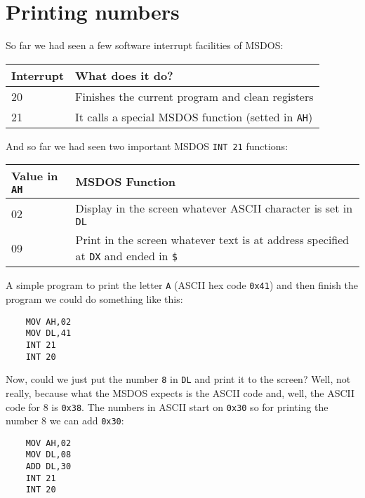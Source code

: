 \documentclass[main.tex]{subfiles}
\begin{document}
\chapter{Printing numbers}
So far we had seen a few software interrupt facilities of MSDOS:

\begin{tabular}{ll}
\toprule
Interrupt & What does it do? \\
\midrule
20 & Finishes the current program and clean registers \\
21 & It calls a special MSDOS function (setted in \texttt{AH}) \\
\bottomrule
\end{tabular}

And so far we had seen two important MSDOS \texttt{INT 21} functions:

\begin{tabular}{ll}
\toprule
Value in \texttt{AH} & MSDOS Function \\
\midrule
02 & Display in the screen whatever ASCII character is set in \texttt{DL} \\
09 & Print in the screen whatever text is at address specified at \texttt{DX} and ended in \texttt{\$} \\
\bottomrule
\end{tabular}

A simple program to print the letter \texttt{A} (ASCII hex code \texttt{0x41}) and then finish the program we could do something like this:

\begin{verbatim}
    MOV AH,02
    MOV DL,41
    INT 21
    INT 20
\end{verbatim}

Now, could we just put the number \texttt{8} in \texttt{DL} and print it to the screen? Well, not really, because what the MSDOS expects is the ASCII code and, well, the ASCII code for 8 is \texttt{0x38}. The numbers in ASCII start on \texttt{0x30} so for printing the number 8 we can add \texttt{0x30}:

\begin{verbatim}
    MOV AH,02
    MOV DL,08
    ADD DL,30
    INT 21
    INT 20
\end{verbatim}
\end{document}
